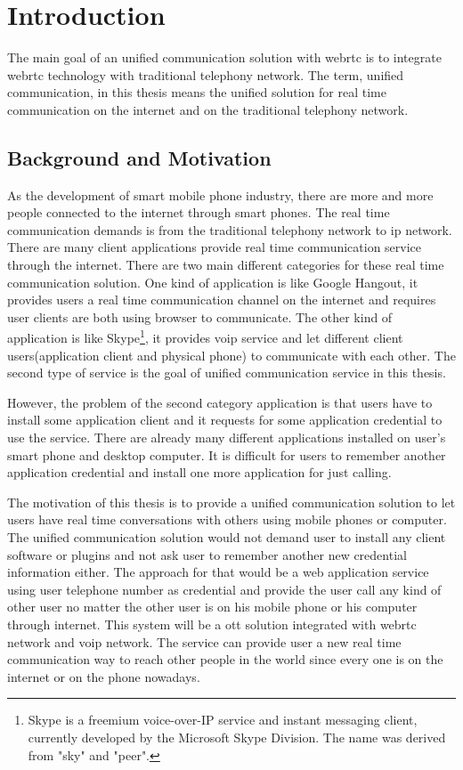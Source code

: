 \chapter{Introduction}
\label{chp:intro}

\noindent The main goal of an unified communication solution with \gls{webrtc} is to integrate \gls{webrtc} technology with traditional telephony network. The term, unified communication, in this thesis means the unified solution for real time communication on the internet and on the traditional telephony network.

\section{Background and Motivation}

\par As the development of smart mobile phone industry, there are more and more people connected to the internet through smart phones. The real time communication demands is from the traditional telephony network to \gls{ip} network. There are many client applications provide real time communication service through the internet. There are two main different categories for these real time communication solution. One kind of application is like Google Hangout, it provides users a real time communication channel on the internet and requires user clients are both using browser to communicate. The other kind of application is like Skype\footnote{Skype is a freemium voice-over-IP service and instant messaging client, currently developed by the Microsoft Skype Division. The name was derived from "sky" and "peer".\cite{wiki:skype}}, it provides \gls{voip} service and let different client users(application client and physical phone) to communicate with each other. The second type of service is the goal of unified communication service in this thesis.

\par However, the problem of the second category application is that users have to install some application client and it requests for some application credential to use the service. There are already many different applications installed on user's smart phone and desktop computer. It is difficult for users to remember another application credential and install one more application for just calling.

\par The motivation of this thesis is to provide a unified communication solution to let users have real time conversations with others using mobile phones or computer. The unified communication solution would not demand user to install any client software or plugins and not ask user to remember another new credential information either. The approach for that would be a web application service using user telephone number as credential and provide the user call any kind of other user no matter the other user is on his mobile phone or his computer through internet. This system will be a \gls{ott} solution integrated with \gls{webrtc} network and \gls{voip} network. The service can provide user a new real time communication way to reach other people in the world since every one is on the internet or on the phone nowadays.

